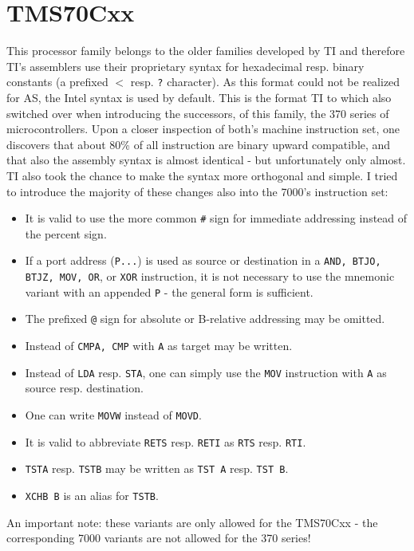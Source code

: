 \documentclass[12pt,twoside]{report}
\newcommand{\tty}[1]{{\tt #1}}
\begin{document}

\section{TMS70Cxx}

This processor family belongs to the older families developed by TI
and therefore TI's assemblers use their proprietary syntax for
hexadecimal resp. binary constants (a prefixed $<$ resp. \tty{?} character). 
As this format could not be realized for AS, the Intel syntax is used
by default.  This is the format TI to which also switched over when
introducing the successors, of this family, the 370 series of
microcontrollers.  Upon a closer inspection of both's machine
instruction set, one discovers that about 80\% of all instruction are
binary upward compatible, and that also the assembly syntax is almost
identical - but unfortunately only almost.  TI also took the chance to
make the syntax more orthogonal and simple.  I tried to introduce
the majority of these changes also into the 7000's instruction set:
\begin{itemize}
\item{It is valid to use the more common \tty{\#} sign for immediate addressing
      instead of the percent sign.}
\item{If a port address (\tty{P...}) is used as source or destination in a 
      \tty{AND, BTJO, BTJZ, MOV, OR}, or \tty{XOR} instruction, it is not necessary
      to use the mnemonic variant with an appended \tty{P} - the general
      form is sufficient.}
\item{The prefixed \tty{@} sign for absolute or B-relative addressing may be
      omitted.}
\item{Instead of \tty{CMPA, CMP} with \tty{A} as target may be written.}
\item{Instead of \tty{LDA} resp. \tty{STA}, one can simply use the
      \tty{MOV} instruction with \tty{A} as source resp. destination.}
\item{One can write \tty{MOVW} instead of \tty{MOVD}.}
\item{It is valid to abbreviate \tty{RETS} resp. \tty{RETI} as \tty{RTS}
      resp. \tty{RTI}.}
\item{\tty{TSTA} resp. \tty{TSTB} may be written as \tty{TST A} resp.
      \tty{TST B}.}
\item{\tty{XCHB B} is an alias for \tty{TSTB}.}
\end{itemize}
An important note: these variants are only allowed for the TMS70Cxx -
the corresponding 7000 variants are not allowed for the 370 series!
\end{document}
